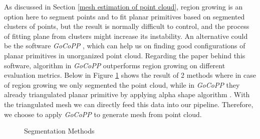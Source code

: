 \documentclass[11pt, a4paper,oneside,chapterprefix=false]{scrbook}
\begin{document}
As discussed in Section \ref{mesh estimation of point cloud}, region growing is an option here to segment points and to fit planar primitives based on segmented clusters of points, but the result is normally difficult to control, and the process of fitting plane from clusters might increase its instability. An alternative could be the software \emph{GoCoPP} \cite{YL:22}, which can help us on finding good configurations of planar primitives in unorganized point cloud. Regarding the paper behind this software, algorithm in \emph{GoCoPP} outperforms region growing on different evaluation metrics. Below in Figure \ref{segmentation results} shows the result of 2 methods where in case of region growing we only segmented the point cloud, while in \emph{GoCoPP} they already triangulated planar primitive by applying alpha shape algorithm \cite{Akkiraju:95}. With the triangulated mesh we can directly feed this data into our pipeline. Therefore, we choose to apply \emph{GoCoPP} to generate mesh from point cloud.

\begin{figure}[H]
    \centering
      \label{fig:region growing} 
     \label{fig:gocopp}
    \caption{Segmentation Methods}
    \label{segmentation results}
\end{figure}
\end{document}
